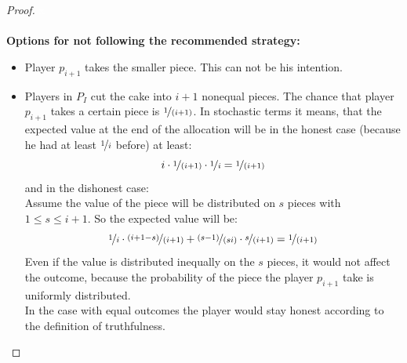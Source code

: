 \begin{proof} 
\textcolor{white}{x}\\\\
\textbf{Options for not following the recommended strategy:}
\begin{itemize}
\item Player $p_{i+1}$ takes the smaller piece. This can not be his intention.
\item Players in $P_I$ cut the cake into $i+1$ nonequal pieces. The chance that player $p_{i+1}$ takes a certain piece is $\nicefrac{1}{(i+1)}$. In stochastic terms it means, that the expected value at the end of the allocation will be in the honest case (because he had at least $\nicefrac{1}{i}$ before) at least: $$ i \cdot \nicefrac{1}{(i+1)} \cdot \nicefrac{1}{i} =\nicefrac{1}{(i+1)} $$ and in the dishonest case:\\
Assume the value of the piece will be distributed on $s$ pieces with $1 \leq s \leq i+1$. So the expected value will be: $$ \nicefrac{1}{i} \cdot \nicefrac{(i+1-s)}{(i+1)} + \nicefrac{(s-1)}{(si)}\cdot \nicefrac{s}{(i+1)} =\nicefrac{1}{(i+1)} $$ Even if the value is distributed inequally on the $s$ pieces, it would not affect the outcome, because the probability of the piece the player $p_{i+1}$ take is uniformly distributed.\\
 \newline In the case with equal outcomes the player would stay honest according to the definition of truthfulness.
\end{itemize}
\end{proof}
